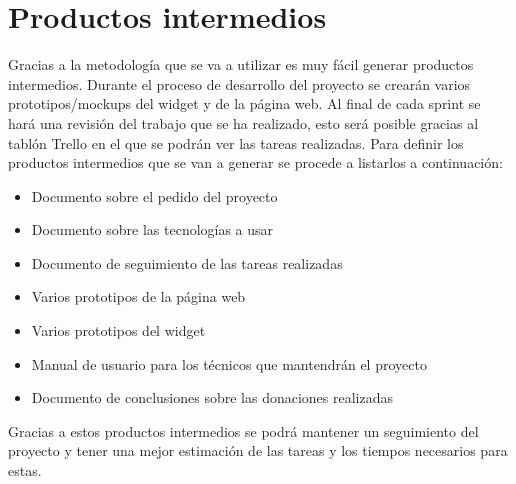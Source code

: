 \section{Productos intermedios}

Gracias a la metodología que se va a utilizar es muy fácil generar productos intermedios. Durante el proceso de desarrollo del proyecto se crearán varios prototipos/mockups del widget y de la página web. Al final de cada sprint se hará una revisión del trabajo que se ha realizado, esto será posible gracias al tablón Trello en el que se podrán ver las tareas realizadas. Para definir los productos intermedios que se van a generar se procede a listarlos a continuación:

\begin{itemize}
	\item Documento sobre el pedido del proyecto
	\item Documento sobre las tecnologías a usar
	\item Documento de seguimiento de las tareas realizadas
	\item Varios prototipos de la página web
	\item Varios prototipos del widget
	\item Manual de usuario para los técnicos que mantendrán el proyecto
	\item Documento de conclusiones sobre las donaciones realizadas
\end{itemize}

Gracias a estos productos intermedios se podrá mantener un seguimiento del proyecto y tener una mejor estimación de las tareas y los tiempos necesarios para estas.
